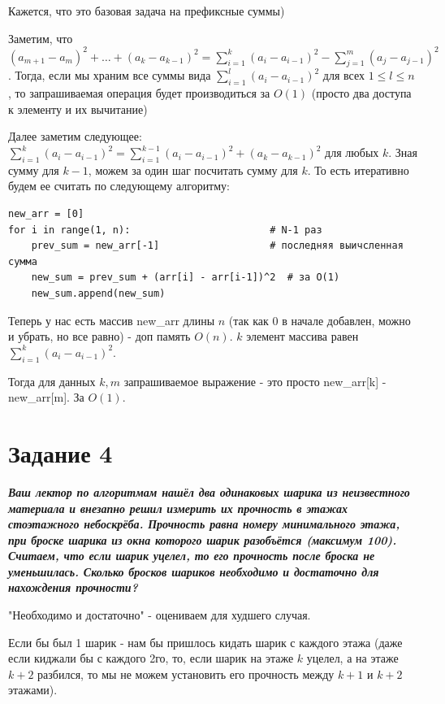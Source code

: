 \documentclass{article}
\begin{document}
Кажется, что это базовая задача на префиксные суммы)

Заметим, что $(a_{m+1} - a_m)^2 + \dots + (a_{k} - a_{k-1})^2 = \sum_{i=1}^{k} (a_i - a_{i-1})^2 - \sum_{j=1}^{m} (a_j - a_{j-1})^2$. Тогда, если мы храним все суммы вида $\sum_{i=1}^{l} (a_i - a_{i-1})^2$ для всех $1 \leq l \leq n$, то запрашиваемая операция будет производиться за $O(1)$ (просто два доступа к элементу и их вычитание)

Далее заметим следующее:
$\sum_{i=1}^{k} (a_i - a_{i-1})^2 = \sum_{i=1}^{k-1} (a_i - a_{i-1})^2 + (a_k - a_{k-1})^2$ для любых $k$. Зная сумму для $k-1$, можем за один шаг посчитать сумму для $k$. То есть итеративно будем ее считать по следующему алгоритму:


\begin{verbatim}
new_arr = [0]
for i in range(1, n):                        # N-1 раз
    prev_sum = new_arr[-1]                   # последняя выичсленная сумма
    new_sum = prev_sum + (arr[i] - arr[i-1])^2  # за O(1)
    new_sum.append(new_sum)
\end{verbatim}

Теперь у нас есть массив new\_arr длины $n$ (так как 0 в начале добавлен, можно и убрать, но все равно) - доп память $O(n)$. $k$ элемент массива равен $\sum_{i=1}^{k} (a_i - a_{i-1})^2$.

Тогда для данных $k, m$ запрашиваемое выражение - это просто new\_arr[k] - new\_arr[m]. За $O(1)$. 


\bigskip


\section*{\textbf{Задание 4}} \textbf{\textit{Ваш лектор по алгоритмам нашёл два одинаковых шарика из неизвестного материала и внезапно решил измерить их прочность в этажах стоэтажного небоскрёба. Прочность равна номеру минимального этажа, при броске шарика из окна которого шарик
разобъётся (максимум 100). Считаем, что если шарик уцелел, то его прочность после броска не уменьшилась. Сколько бросков шариков необходимо и достаточно для нахождения прочности?}}

"Необходимо и достаточно" - оцениваем для худшего случая.

Если бы был 1 шарик - нам бы пришлось кидать шарик с каждого этажа (даже если киджали бы с каждого 2го, то, если шарик на этаже $k$ уцелел, а на этаже $k+2$ разбился, то мы не можем установить его прочность между $k+1$ и $k+2$ этажами).
\end{document}
